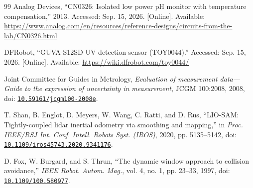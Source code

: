 \documentclass[11pt,a4paper]{article}
\begin{document}
\begin{thebibliography}{99}
Analog Devices, “CN0326: Isolated low power pH monitor with temperature compensation,” 2013. Accessed: Sep. 15, 2026. [Online]. Available: \url{https://www.analog.com/en/resources/reference-designs/circuits-from-the-lab/CN0326.html}

DFRobot, “GUVA-S12SD UV detection sensor (TOY0044).” Accessed: Sep. 15, 2026. [Online]. Available: \url{https://wiki.dfrobot.com/toy0044/}

Joint Committee for Guides in Metrology, \textit{Evaluation of measurement data---Guide to the expression of uncertainty in measurement}, JCGM 100:2008, 2008, doi: \href{https://doi.org/10.59161/jcgm100-2008e}{\nolinkurl{10.59161/jcgm100-2008e}}.

T. Shan, B. Englot, D. Meyers, W. Wang, C. Ratti, and D. Rus, “LIO-SAM: Tightly-coupled lidar inertial odometry via smoothing and mapping,” in \textit{Proc. IEEE/RSJ Int. Conf. Intell. Robots Syst. (IROS)}, 2020, pp. 5135--5142, doi: \href{https://doi.org/10.1109/iros45743.2020.9341176}{\nolinkurl{10.1109/iros45743.2020.9341176}}.

D. Fox, W. Burgard, and S. Thrun, “The dynamic window approach to collision avoidance,” \textit{IEEE Robot. Autom. Mag.}, vol. 4, no. 1, pp. 23--33, 1997, doi: \href{https://doi.org/10.1109/100.580977}{\nolinkurl{10.1109/100.580977}}.

\end{thebibliography}
\end{document}
